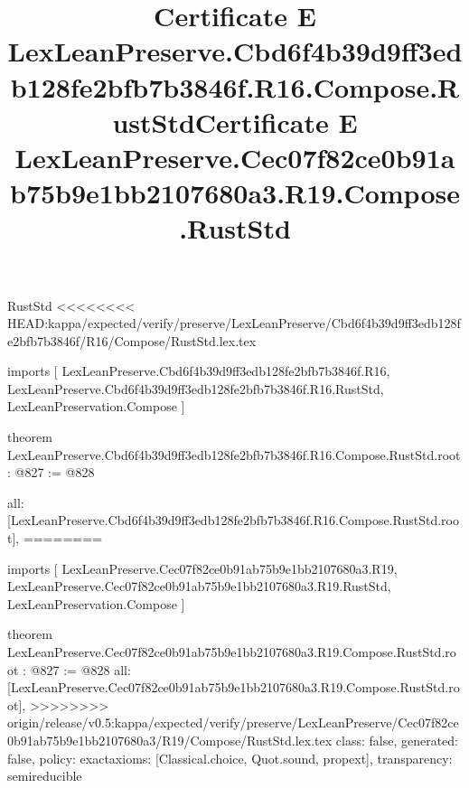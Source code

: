 \begin{lexlean}{RustStd}
<<<<<<<< HEAD:kappa/expected/verify/preserve/LexLeanPreserve/Cbd6f4b39d9ff3edb128fe2bfb7b3846f/R16/Compose/RustStd.lex.tex
\title{Certificate E LexLeanPreserve.Cbd6f4b39d9ff3edb128fe2bfb7b3846f.R16.Compose.RustStd}
\begin{coremodule}
imports [
  LexLeanPreserve.Cbd6f4b39d9ff3edb128fe2bfb7b3846f.R16,
  LexLeanPreserve.Cbd6f4b39d9ff3edb128fe2bfb7b3846f.R16.RustStd,
  LexLeanPreservation.Compose
]

theorem LexLeanPreserve.Cbd6f4b39d9ff3edb128fe2bfb7b3846f.R16.Compose.RustStd.root : @827 := @828 {
  all: [LexLeanPreserve.Cbd6f4b39d9ff3edb128fe2bfb7b3846f.R16.Compose.RustStd.root],
========
\title{Certificate E LexLeanPreserve.Cec07f82ce0b91ab75b9e1bb2107680a3.R19.Compose.RustStd}
\begin{coremodule}
imports [
  LexLeanPreserve.Cec07f82ce0b91ab75b9e1bb2107680a3.R19,
  LexLeanPreserve.Cec07f82ce0b91ab75b9e1bb2107680a3.R19.RustStd,
  LexLeanPreservation.Compose
]

theorem LexLeanPreserve.Cec07f82ce0b91ab75b9e1bb2107680a3.R19.Compose.RustStd.root : @827 := @828 {
  all: [LexLeanPreserve.Cec07f82ce0b91ab75b9e1bb2107680a3.R19.Compose.RustStd.root],
>>>>>>>> origin/release/v0.5:kappa/expected/verify/preserve/LexLeanPreserve/Cec07f82ce0b91ab75b9e1bb2107680a3/R19/Compose/RustStd.lex.tex
  class: false,
  generated: false,
  policy: exact{axioms: [Classical.choice, Quot.sound, propext]},
  transparency: semireducible
}


\end{coremodule}}
\end{coremodule}
\end{lexlean}
